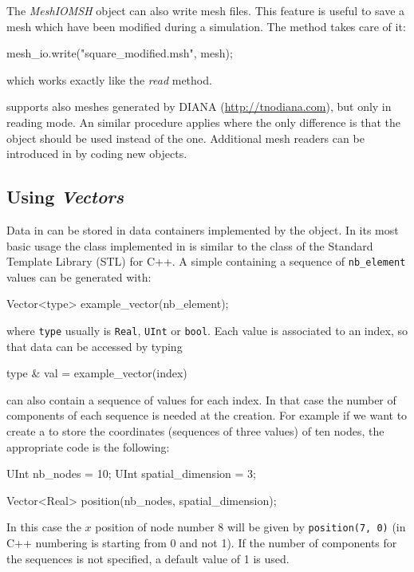 The \textit{MeshIOMSH} object can also write mesh files. This
feature is useful to save a mesh which have been modified during a
simulation. The  method takes care of it:
\begin{cpp}
  mesh_io.write("square_modified.msh", mesh);
\end{cpp}
which works exactly like the \textit{read} method.

\akantu supports also meshes generated by
DIANA (\url{http://tnodiana.com}), but only in reading mode. An similar
procedure applies where the only
difference is that the  object should be used
instead of the  one. Additional mesh readers can be
introduced in \akantu by coding new  objects.

\subsection{Using \textit{Vectors}}

Data in \akantu can be stored in data containers implemented by
the  object. In its most basic usage the  class
implemented in \akantu is similar to the  class of
the Standard Template Library (STL) for C++. A simple 
containing a sequence of \texttt{nb\_element} values can be generated with:
\begin{cpp}
  Vector<type> example_vector(nb_element);
\end{cpp}
where \texttt{type} usually is \texttt{Real}, \texttt{UInt} or
\texttt{bool}. Each value is associated to an index, so that data can be
accessed by typing

\begin{cpp}
  type & val = example\_vector(index)
\end{cpp}

 can also contain a
sequence of values for each index. In that case the number of components 
of each sequence is needed at the  creation. 
For example if we want to create a  to store
the coordinates (sequences of three values) of ten nodes, the appropriate 
code is the following:
\begin{cpp}
  UInt nb_nodes = 10;
  UInt spatial_dimension = 3;

  Vector<Real> position(nb_nodes, spatial_dimension);
\end{cpp}
In this case the $x$ position of node number 8 will be given by
\texttt{position(7, 0)} (in C++ numbering is starting from 0 and not
1). If the number of components for the sequences is not specified, a
default value of 1 is used. 

